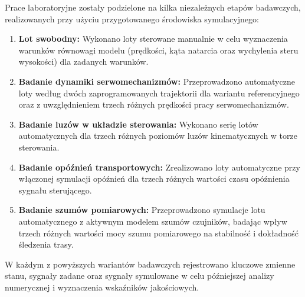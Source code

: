 \akapit Prace laboratoryjne zostały podzielone na kilka niezależnych etapów badawczych, realizowanych przy użyciu przygotowanego środowiska symulacyjnego:
\begin{enumerate}
    \item \textbf{Lot swobodny:} Wykonano loty sterowane manualnie w celu wyznaczenia warunków równowagi modelu (prędkości, kąta natarcia oraz wychylenia steru wysokości) dla zadanych warunków.
    \item \textbf{Badanie dynamiki serwomechanizmów:} Przeprowadzono automatyczne loty według dwóch zaprogramowanych trajektorii dla wariantu referencyjnego oraz z uwzględnieniem trzech różnych prędkości pracy serwomechanizmów.
    \item \textbf{Badanie luzów w układzie sterowania:} Wykonano serię lotów automatycznych dla trzech różnych poziomów luzów kinematycznych w torze sterowania.
    \item \textbf{Badanie opóźnień transportowych:} Zrealizowano loty automatyczne przy włączonej symulacji opóźnień dla trzech różnych wartości czasu opóźnienia sygnału sterującego.
    \item \textbf{Badanie szumów pomiarowych:} Przeprowadzono symulacje lotu automatycznego z aktywnym modelem szumów czujników, badając wpływ trzech różnych wartości mocy szumu pomiarowego na stabilność i dokładność śledzenia trasy.
\end{enumerate}
\akapit W każdym z powyższych wariantów badawczych rejestrowano kluczowe zmienne stanu, sygnały zadane oraz sygnały symulowane w celu późniejszej analizy numerycznej i wyznaczenia wskaźników jakościowych.
